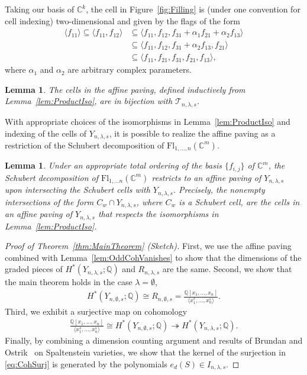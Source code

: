 \documentclass[submission]{FPSAC2021}
\theoremstyle{plain}
\newtheorem{lemma}[theorem]{Lemma}
\newenvironment{example}
 {\pushQED{\qed}\examplex}
  {\popQED\endexamplex}
\numberwithin{equation}{section}
\newcommand{\bC}{\mathbb{C}}
\newcommand{\bQ}{\mathbb{Q}}
\newcommand{\Fl}{\mathrm{Fl}}
\newcommand{\la}{\lambda}
\begin{document}
\begin{example}
Taking our basis of $\mathbb{C}^k$,
the cell in Figure~\ref{fig:Filling} is (under one convention for cell indexing) two-dimensional and given by the flags of the form
\begin{align*}
\langle f_{11} \rangle \subseteq
\langle f_{11}, f_{12}\rangle &\subseteq
\langle f_{11}, f_{12}, f_{31}+\alpha_1f_{21}+\alpha_2f_{13}\rangle \\
&\subseteq \langle f_{11}, f_{12}, f_{31}+\alpha_2f_{13}, f_{21} \rangle \\
& \subseteq \langle f_{11}, f_{21}, f_{31}, f_{21}, f_{13}\rangle,
\end{align*}
where $\alpha_1$ and $\alpha_2$ are arbitrary complex parameters.
\end{example}




\begin{lemma}
The cells in the affine paving, defined inductively from Lemma~\ref{lem:ProductIso}, are in bijection with $\mathcal{T}_{n,\lambda,s}$.
\end{lemma}




With appropriate choices of the isomorphisms in Lemma~\ref{lem:ProductIso} and indexing of the cells of $Y_{n,\la,s}$, it is possible to realize the affine paving as a restriction of the Schubert decomposition of $\Fl_{1,\dots,n}(\bC^m)$.

\begin{lemma}
Under an appropriate total ordering of the basis $\{f_{i,j}\}$ of $\bC^m$, the Schubert decomposition of $\Fl_{1,\dots n}(\bC^m)$ restricts to an affine paving of $Y_{n,\la,s}$ upon intersecting the Schubert cells with $Y_{n,\la,s}$. Precisely, the nonempty intersections of the form $C_w\cap Y_{n,\la,s}$, where $C_w$ is a Schubert cell, are the cells in an affine paving of $Y_{n,\la,s}$ that respects the isomorphisms in Lemma~\ref{lem:ProductIso}.
\end{lemma}

\begin{proof}[Proof of Theorem~\ref{thm:MainTheorem} (Sketch)]
First, we use the affine paving combined with Lemma~\ref{lem:OddCohVanishes} to show that the dimensions of the graded pieces of $H^*(Y_{n,\lambda,s};\bQ)$ and $R_{n,\lambda,s}$ are the same. Second, we show that the main theorem holds in the case $\lambda=\emptyset$,
\begin{align}
H^*(Y_{n,\emptyset,s};\bQ) \cong R_{n,\emptyset,s} = \frac{\bQ[x_1,\dots,x_n]}{\langle x_1^s,\dots, x_n^s\rangle}.
\end{align}
Third, we exhibit a surjective map on cohomology
\begin{align}\label{eq:CohSurj}
    \frac{\bQ[x_1,\dots, x_n]}{\langle x_1^s,\dots,x_n^s\rangle} \cong H^*(Y_{n,\emptyset,s};\bQ) \twoheadrightarrow H^*(Y_{n,\la,s};\bQ).
\end{align}
Finally, by combining a dimension counting argument and results of Brundan and Ostrik~\cite{Brundan-Ostrik} on Spaltenstein varieties, we show that the kernel of the surjection in \eqref{eq:CohSurj} is generated by the polynomials $e_d(S)\in I_{n,\lambda,s}$.
\end{proof}
\end{document}
